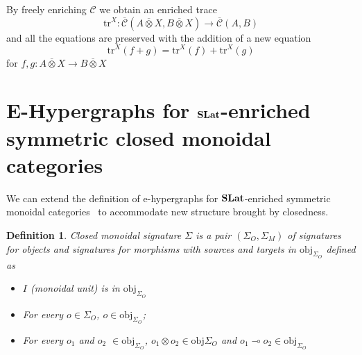 \documentclass[acmsmall, screen, nonacm]{acmart}
\newtheorem{definition}[theorem]{Definition}
\newcommand\enriched[1]{{\overline{\mathcal{#1}}}}
\begin{document}
By freely enriching $\mathcal{C}$ we obtain an enriched trace
\[
\text{tr}^{X} : \enriched{C}(A \overline{\otimes} X, B \overline{\otimes} X) \to \enriched{C}(A,B)
\]
and all the equations are preserved with the addition of a new equation
\[
  \text{tr}^{X}(f + g) = \text{tr}^{X}(f) + \text{tr}^{X}(g)
\]
for $f,g : A \overline{\otimes} X \to B \overline{\otimes} X$


\section{E-Hypergraphs for $\mathbf{SLat}$-enriched symmetric closed monoidal categories}


We can extend the definition of e-hypergraphs for $\mathbf{SLat}$-enriched symmetric monoidal categories~\cite{ghica2024equivalencehypergraphsegraphsmonoidal} to accommodate new structure brought by closedness.

\begin{definition}
Closed monoidal signature $\Sigma$ is a pair $(\Sigma_{O},\Sigma_{M})$ of signatures for objects and signatures for morphisms with sources and targets in $\text{obj}_{\Sigma_{O}}$ defined as
\begin{itemize}
  \item $I$ (monoidal unit) is in $\text{obj}_{\Sigma_{O}}$
  \item For every $o \in \Sigma_{O}$, $o \in \text{obj}_{\Sigma_{O}}$;
  \item For every $o_1$ and $o_2$ $ \in \text{obj}_{\Sigma_{O}}$, $o_1 \otimes o_2 \in \text{obj}{\Sigma_{O}}$ and $o_1 \multimap o_2 \in \text{obj}_{\Sigma_{O}}$
\end{itemize}
\end{definition}
\end{document}
